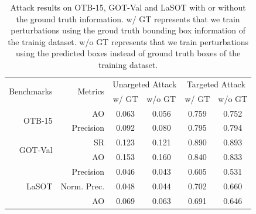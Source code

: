 \documentclass[journal]{IEEEtran}
\begin{document}
\begin{table}[t]
  \centering
  \caption{Attack results on OTB-15, GOT-Val and LaSOT with or without the ground truth information. w/ GT represents that we train perturbations using the groud truth bounding box information of the trainig dataset. w/o GT represents that we train perturbations using the predicted boxes instead of ground truth boxes of the training dataset.}
  \begin{tabular}{rrcccc}
  \toprule
  \multirow{2}{*}[-2pt]{Benchmarks} & \multirow{2}{*}[-2pt]{Metrics} & \multicolumn{2}{c}{Unargeted Attack} & \multicolumn{2}{c}{Targeted Attack} \\ \cmidrule{3-6}
                              &                          & w/ GT  & \multicolumn{1}{l}{w/o GT}  & w/ GT  & \multicolumn{1}{l}{w/o GT} \\ \midrule
  \multirow{2}{*}{OTB-15}     & AO                       & 0.063  & 0.056                       & 0.759  & 0.752                      \\
                              & Precision                & 0.092  & 0.080                       & 0.795  & 0.794                      \\ \midrule
  \multirow{2}{*}{GOT-Val}    & SR                       & 0.123  & 0.121                       & 0.890  & 0.893                      \\
                              & AO                       & 0.153  & 0.160                       & 0.840  & 0.833                      \\ \midrule
  \multirow{3}{*}{LaSOT}      & Precision                & 0.046  & 0.043                       & 0.605  & 0.531                      \\
                              & Norm. Prec.              & 0.048  & 0.044                       & 0.702  & 0.660                      \\
                              & AO                       & 0.069  & 0.063                       & 0.691  & 0.646                      \\ \bottomrule
  \end{tabular}
  \label{tab:agent_GT}
\end{table}
\end{document}

